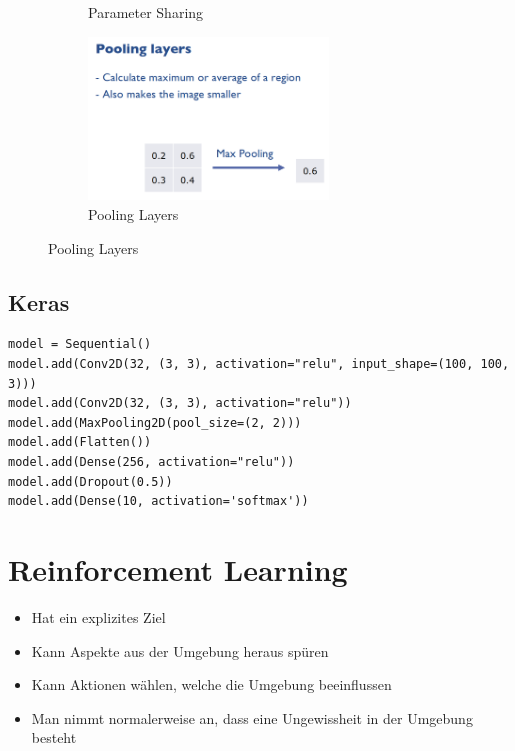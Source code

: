 \documentclass[a4paper]{article}
\begin{document}
\begin{figure}[htb!]
\begin{subfigure}[b]{0.475\textwidth}
				\caption{Parameter Sharing}
			\end{subfigure}
			\quad
			\begin{subfigure}[b]{0.475\textwidth}
				\centering
				\includegraphics[width=0.7\textwidth]{img/07_convolutional_nn/pooling_layers.png}
				\caption{Pooling Layers}
			\end{subfigure}
		\end{figure}
	
		\subsection{Keras}
		
		\begin{lstlisting}
model = Sequential()
model.add(Conv2D(32, (3, 3), activation="relu", input_shape=(100, 100, 3)))
model.add(Conv2D(32, (3, 3), activation="relu"))
model.add(MaxPooling2D(pool_size=(2, 2)))
model.add(Flatten())
model.add(Dense(256, activation="relu"))
model.add(Dropout(0.5))
model.add(Dense(10, activation='softmax'))
		\end{lstlisting}
	
	\newpage
	
	\section{Reinforcement Learning}
	
		\begin{itemize}
			\item Hat ein explizites Ziel
			\item Kann Aspekte aus der Umgebung heraus spüren
			\item Kann Aktionen wählen, welche die Umgebung beeinflussen
			\item Man nimmt normalerweise an, dass eine Ungewissheit in der Umgebung besteht
		\end{itemize}
	
\end{document}
